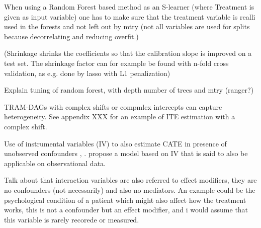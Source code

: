 When using a Random Forest based method as an S-learner (where Treatment is given as input variable) one has to make sure that the treatment variable is realli used in the forests and not left out by mtry (not all variables are used for splits because decorrelating and reducing overfit.)

(Shrinkage shrinks the coefficients so that the calibration slope is improved on a test set. The shrinkage factor can for example be found with n-fold cross validation, as e.g. done by lasso with L1 penalization)

Explain tuning of random forest, with depth number of trees and mtry (ranger?)


TRAM-DAGs with complex shifts or compmlex intercepts can capture heterogeneity. See appendix XXX for an example of ITE estimation with a complex shift.

Use of instrumental variables (IV) to also estimate CATE in presence of unobserved confounders \citep{nichols2007}, \citep{hartford2017}. \citet{frauen2023} propose a model based on IV that is said to also be applicable on observational data. %








Talk about that interaction variables are also referred to effect modifiers, they are no confounders (not necessarily) and also no mediators.  An example could be the psychological condition of a patient which might also affect how the treatment works, this is not a confounder but an effect modifier, and i would assume that this variable is rarely recorede or measured.

